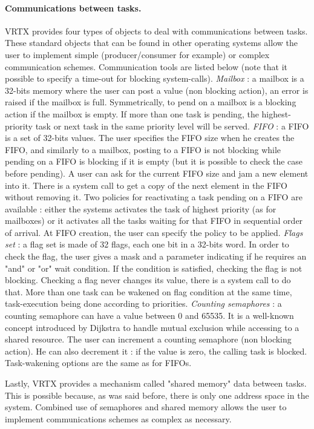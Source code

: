 \documentclass[10pt]{report}
\begin{document}
\paragraph{Communications between tasks.} VRTX provides four types of objects to deal with communications 
between tasks. These standard objects that can be found in other 
operating systems allow the user to implement simple 
(producer/consumer for example) or complex communication schemes. 
Communication tools are listed below (note that it possible to 
specify a time-out for blocking system-calls). {\em Mailbox} : a 
mailbox is a 32-bits memory where the user can post a value (non 
blocking action), an error is raised if the mailbox is full. 
Symmetrically, to pend on a mailbox is a blocking action if the 
mailbox is empty. If more than one task is pending, the 
highest-priority task or next task in the same priority level 
will be served. {\em FIFO} :
a FIFO is a set of 32-bits values. The 
user specifies the FIFO size when he creates the FIFO, and 
similarly to a mailbox, posting to a FIFO is not blocking while 
pending on a FIFO is blocking if it is empty (but it is possible 
to check the case before pending). A user can ask for the current 
FIFO size and jam a new element into it. There is a system call 
to get a copy of the next element in the FIFO without removing 
it. Two policies for reactivating a task pending on a FIFO are 
available : either the systems activates the task of highest 
priority (as for mailboxes) or it activates all the tasks waiting 
for that FIFO in sequential order of arrival. At FIFO creation, 
the user can specify the policy to be applied. {\em Flags set} : a 
flag set is made of 32 flags, each one bit in a 32-bits word. In 
order to check the flag, the user gives a mask and a parameter 
indicating if he requires an "and" or "or" wait condition. If the 
condition is satisfied, checking the flag is not blocking. 
Checking a flag never changes its value, there is a system call 
to do that. More than one task can be wakened on flag condition 
at the same time, task-execution being done according to 
priorities. {\em Counting semaphores} : a counting semaphore can have 
a value between 0 and 65535. It is a well-known concept 
introduced by Dijkstra to handle mutual exclusion while accessing 
to a shared resource. The user can increment a counting semaphore 
(non blocking action). He can also decrement it : if the value is 
zero, the calling task is blocked. Task-wakening options are the 
same as for FIFOs.

Lastly, VRTX provides a mechanism called "shared memory"
data between tasks. This is possible because, as was said before, 
there is only one address space in the system. Combined use of 
semaphores and shared memory allows the user to implement 
communications schemes as complex as necessary.
\end{document}
